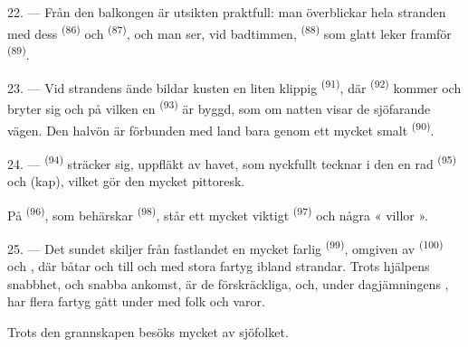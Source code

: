 22. --- Från den balkongen är utsikten praktfull: man överblickar hela stranden med dess
 \textsuperscript{(86)} och  \textsuperscript{(87)}, och man
ser, vid badtimmen,  \textsuperscript{(88)} som glatt leker framför
 \textsuperscript{(89)}.

23. --- Vid strandens ände bildar kusten en liten klippig 
\textsuperscript{(91)}, där  \textsuperscript{(92)} kommer och bryter sig
och på vilken en  \textsuperscript{(93)} är byggd, som om natten visar de
sjöfarande vägen. Den halvön är förbunden med land bara genom ett mycket smalt 
\textsuperscript{(90)}.

\VUsaut{3.0mm}
\VUsaut{3.0mm}

24. ---  \textsuperscript{(94)} sträcker sig, uppfläkt av havet, som
nyckfullt tecknar i den en rad  \textsuperscript{(95)} och  (kap),
vilket gör den mycket pittoresk.

På  \textsuperscript{(96)}, som behärskar 
\textsuperscript{(98)}, står ett mycket viktigt  \textsuperscript{(97)} och några
« villor ».

25. --- Det sundet skiljer från fastlandet en mycket farlig  \textsuperscript{(99)},
omgiven av  \textsuperscript{(100)} och
, där båtar och till och med stora fartyg ibland strandar.
Trots hjälpens snabbhet, och  snabba ankomst, är de
 förskräckliga, och, under dagjämningens
, har flera fartyg gått under med folk och varor.

Trots den grannskapen besöks  mycket av sjöfolket.
\VUsaut{6.0mm}
\VUfilet{22mm}
